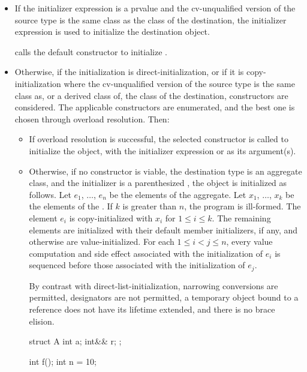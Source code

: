 \begin{itemize}
\begin{itemize}
\item
If the initializer expression is a prvalue
and the cv-unqualified version of the source type
is the same class as the class of the destination,
the initializer expression is used to initialize the destination object.
\begin{example}
 calls the  default constructor to initialize .
\end{example}
\item
Otherwise, if the initialization is direct-initialization,
or if it is copy-initialization where the cv-unqualified version of the source
type is the same class as, or a derived class of, the class of the destination,
constructors are considered.
The applicable constructors
are enumerated, and the best one is chosen
through overload resolution. Then:
\begin{itemize}
\item
If overload resolution is successful,
the selected constructor
is called to initialize the object, with the initializer
expression or  as its argument(s).
\item
Otherwise, if no constructor is viable,
the destination type is
an aggregate class, and
the initializer is a parenthesized ,
the object is initialized as follows.
Let $e_1$, $\dotsc$, $e_n$ be the elements of the aggregate.
Let $x_1$, $\dotsc$, $x_k$ be the elements of the .
If $k$ is greater than $n$, the program is ill-formed.
The element $e_i$ is copy-initialized with
$x_i$ for $1 \leq i \leq k$.
The remaining elements are initialized with
their default member initializers, if any, and
otherwise are value-initialized.
For each $1 \leq i < j \leq n$,
every value computation and side effect
associated with the initialization of $e_i$
is sequenced before those associated with the initialization of $e_j$.
\begin{note}
By contrast with direct-list-initialization,
narrowing conversions are permitted,
designators are not permitted,
a temporary object bound to a reference
does not have its lifetime extended, and
there is no brace elision.
\begin{example}
\begin{codeblock}
struct A {
  int a;
  int&& r;
};

int f();
int n = 10;


\end{codeblock}
\end{example}
\end{note}
\end{itemize}
\end{itemize}
\end{itemize}
